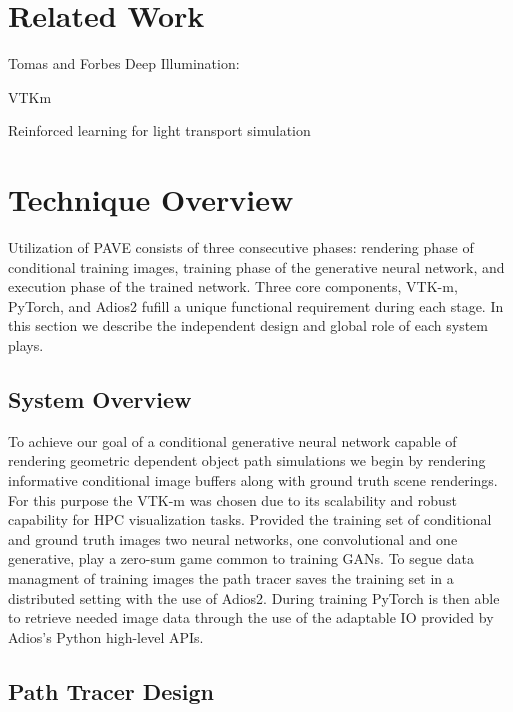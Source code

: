 \documentclass[sigconf,authordraft]{acmart}
\begin{document}
\section{Related Work}

Tomas and Forbes Deep Illumination: \cite{deepillum}

VTKm \cite{vtkm}

Reinforced learning for light transport simulation \cite{dahmTransport}

\section{Technique Overview}

Utilization of PAVE consists of three consecutive phases: rendering phase of conditional training images, training phase of the generative neural network, and execution phase of the trained network. Three core components, VTK-m, PyTorch, and Adios2 fufill a unique functional requirement during each stage. In this section we describe the independent design and global role of each system plays.

\subsection{System Overview}
 
To achieve our goal of a conditional generative neural network capable of rendering geometric dependent object path simulations we begin by rendering informative conditional image buffers along with ground truth scene renderings. For this purpose the VTK-m was chosen due to its scalability and robust capability for HPC visualization tasks. Provided the training set of conditional and ground truth images two neural networks, one convolutional and one generative, play a zero-sum game common to training GANs. To segue data managment of training images the path tracer saves the training set in a distributed setting with the use of Adios2. During training PyTorch is then able to retrieve needed image data through the use of the adaptable IO provided by Adios's Python high-level APIs.

\subsection{Path Tracer Design}
\end{document}
